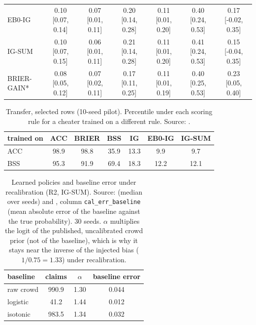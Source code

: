 \documentclass[10pt]{article}
\begin{document}
\begin{table}[!ht]
{\begin{tabular}{@{}lcccccc@{}}
EB0-IG & 0.10 [0.07, 0.14] & 0.07 [0.01, 0.11] & 0.20 [0.14, 0.28] & 0.11 [0.01, 0.20] & 0.40 [0.24, 0.53] & 0.17 [-0.02, 0.35] \\
IG-SUM & 0.10 [0.07, 0.15] & 0.06 [0.01, 0.11] & 0.21 [0.14, 0.28] & 0.11 [0.01, 0.20] & 0.41 [0.24, 0.53] & 0.15 [-0.04, 0.35] \\
BRIER-GAIN* & 0.08 [0.05, 0.12] & 0.07 [0.02, 0.11] & 0.17 [0.11, 0.25] & 0.11 [0.01, 0.19] & 0.40 [0.25, 0.53] & 0.23 [0.05, 0.40] \\
\bottomrule
\end{tabular}}
\end{table}

\begin{table}[!ht]
\centering\small
\caption{Transfer, selected rows (10-seed pilot). Percentile under each scoring rule for a cheater trained on a different rule. Source: .}
\label{tab:A4}
\begin{tabular}{@{}lcccccc@{}}
\toprule
trained on & ACC & BRIER & BSS & IG & EB0-IG & IG-SUM \\
\midrule
ACC & 98.9 & 98.8 & 35.9 & 13.3 & 9.9 & 9.7 \\
BSS & 95.3 & 91.9 & 69.4 & 18.3 & 12.2 & 12.1 \\
\bottomrule
\end{tabular}
\end{table}

\begin{table}[!ht]
\centering\small
\caption{Learned policies and baseline error under recalibration (R2, IG-SUM). Source:  (median over seeds) and , column \texttt{cal\_err\_baseline} (mean absolute error of the baseline against the true probability). 30 seeds. $\alpha$ multiplies the logit of the published, uncalibrated crowd prior (not of the baseline), which is why it stays near the inverse of the injected bias ($1/0.75=1.33$) under recalibration.}
\label{tab:A5}
\begin{tabular}{@{}lccc@{}}
\toprule
baseline & claims & $\alpha$ & baseline error \\
\midrule
raw crowd & 990.9 & 1.30 & 0.044 \\
logistic & 41.2 & 1.44 & 0.012 \\
isotonic & 983.5 & 1.34 & 0.032 \\
\bottomrule
\end{tabular}
\end{table}
\end{document}
